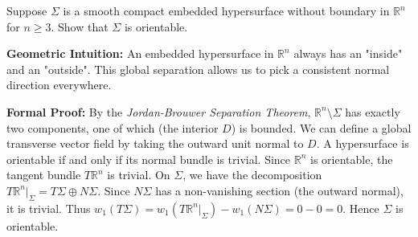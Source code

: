 \begin{exercise}
\label{geometry:2021:6}
Suppose $\Sigma$ is a smooth compact embedded hypersurface without boundary in $\mathbb{R}^{n}$ for $n \geq 3$. Show that $\Sigma$ is orientable.
\end{exercise}

\begin{solution}
\textbf{Geometric Intuition:} An embedded hypersurface in $\mathbb{R}^n$ always has an "inside" and an "outside". This global separation allows us to pick a consistent normal direction everywhere.

\textbf{Formal Proof:}
By the \textit{Jordan-Brouwer Separation Theorem}, $\mathbb{R}^n \setminus \Sigma$ has exactly two components, one of which (the interior $D$) is bounded.
We can define a global transverse vector field by taking the outward unit normal to $D$. 
A hypersurface is orientable if and only if its normal bundle is trivial. 
Since $\mathbb{R}^n$ is orientable, the tangent bundle $T\mathbb{R}^n$ is trivial. On $\Sigma$, we have the decomposition $T\mathbb{R}^n |_\Sigma = T\Sigma \oplus N\Sigma$.
Since $N\Sigma$ has a non-vanishing section (the outward normal), it is trivial.
Thus $w_1(T\Sigma) = w_1(T\mathbb{R}^n|_\Sigma) - w_1(N\Sigma) = 0 - 0 = 0$.
Hence $\Sigma$ is orientable.
\end{solution}
